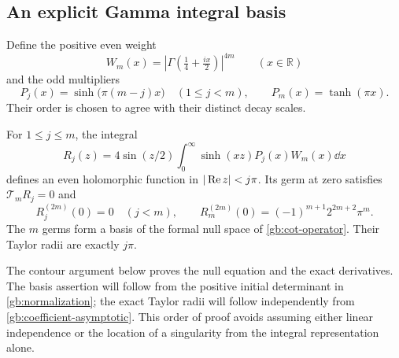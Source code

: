 \subsection{An explicit Gamma integral basis}

Define the positive even weight
\begin{equation}\label{gb:W}
 W_m(x)=\left|\Gamma\!\left(\tfrac14+\tfrac{ix}{2}\right)\right|^{4m}
 \qquad(x\in\mathbb R)
\end{equation}
and the odd multipliers
\begin{equation}\label{gb:P}
 P_j(x)=\sinh\!\bigl(\pi(m-j)x\bigr)\quad(1\le j<m),
 \qquad P_m(x)=\tanh(\pi x).
\end{equation}
Their order is chosen to agree with their distinct decay scales.

\begin{theorem}\label{gb:basis}
For $1\le j\le m$, the integral
\begin{equation}\label{gb:R}
 R_j(z)=4\sin(z/2)\int_0^\infty
                  \sinh(xz)P_j(x)W_m(x)\dd x
\end{equation}
defines an even holomorphic function in $|\operatorname{Re} z|<j\pi$.
Its germ at zero satisfies $\mathcal T_mR_j=0$ and
\begin{equation}\label{gb:top-derivative}
 R_j^{(2m)}(0)=0\quad(j<m),\qquad
 R_m^{(2m)}(0)=(-1)^{m+1}2^{2m+2}\pi^m.
\end{equation}
The $m$ germs form a basis of the formal null space of
\eqref{gb:cot-operator}.  Their Taylor radii are exactly $j\pi$.
\end{theorem}

The contour argument below proves the null equation and the exact
derivatives.  The basis assertion will follow from the positive
initial determinant in \cref{gb:normalization}; the exact Taylor
radii will follow independently from \cref{gb:coefficient-asymptotic}.
This order of proof avoids assuming either linear independence or
the location of a singularity from the integral representation alone.

